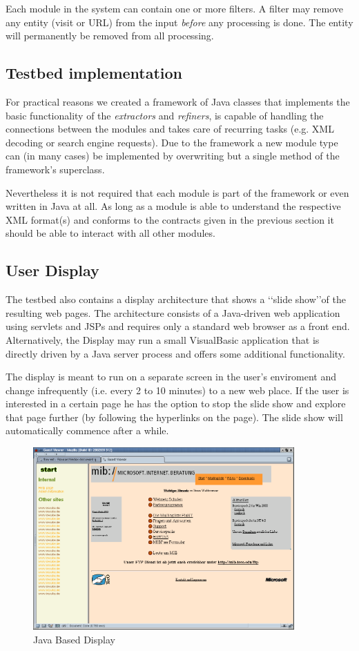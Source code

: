 \documentclass[a4paper]{danarticle}
\begin{document}
      Each module in the system can contain one or more filters. A filter may 
      remove any entity (visit or URL) from the input \textit{before} any 
      processing is done. The entity will permanently be removed from all 
      processing.
    \subsection{Testbed implementation}
      For practical reasons we created a framework of Java classes that 
      implements the basic functionality of the \textit{extractors} and 
      \textit{refiners}, is capable of handling the connections between the 
      modules and takes care of recurring tasks (e.g. XML decoding or search 
      engine requests). Due to the framework a new module type can (in many 
      cases) be implemented by overwriting but a single method of the 
      framework's superclass.
      
      Nevertheless it is not required that each module is part of the 
      framework or even written in Java at all. As long as a module is able to 
      understand the respective XML format(s) and conforms to the contracts 
      given in the previous section it should be able to interact with all 
      other modules.
    \subsection{User Display}
      The testbed also contains a display architecture that shows a \lq\lq slide
      show\rq\rq of the resulting web pages. The architecture consists of a
      Java-driven web application using servlets and JSPs and requires only a
      standard web browser as a front end. Alternatively, the Display may run a
      small VisualBasic application that is directly driven by a Java server
      process and offers some additional functionality.
      
      The display is meant to run on a separate screen in the user's enviroment
      and change infrequently (i.e. every 2 to 10 minutes) to a new web place.
      If the user is interested in a certain page he has the option to stop the
      slide show and explore that page further (by following the hyperlinks on
      the page). The slide show will automatically commence after a while.
      \begin{figure}[ht]
       \centering
	 \includegraphics[width=10cm]{javaclient}
	 \caption{Java Based Display}
	 \label{javaclient}
       \end{figure}
      
\end{document}
